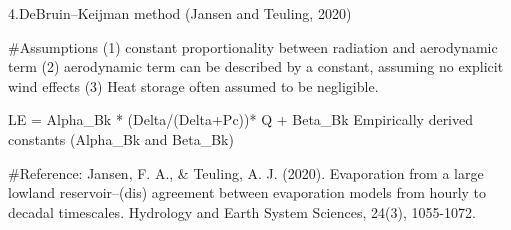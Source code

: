 \documentclass[
]{article}
\newenvironment{Shaded}{\begin{snugshade}}{\end{snugshade}}
\newcommand{\CommentTok}[1]{\textcolor[rgb]{0.56,0.35,0.01}{\textit{#1}}}
\newcommand{\FloatTok}[1]{\textcolor[rgb]{0.00,0.00,0.81}{#1}}
\newcommand{\NormalTok}[1]{#1}
\newcommand{\OtherTok}[1]{\textcolor[rgb]{0.56,0.35,0.01}{#1}}
\newcommand{\SpecialCharTok}[1]{\textcolor[rgb]{0.00,0.00,0.00}{#1}}
\begin{document}
\begin{Shaded}
\end{Shaded}

4.DeBruin--Keijman method (Jansen and Teuling, 2020)

\#Assumptions (1) constant proportionality between radiation and
aerodynamic term (2) aerodynamic term can be described by a constant,
assuming no explicit wind effects (3) Heat storage often assumed to be
negligible.

LE = Alpha\_Bk * (Delta/(Delta+Pc))* Q + Beta\_Bk Empirically derived
constants (Alpha\_Bk and Beta\_Bk)

\#Reference: Jansen, F. A., \& Teuling, A. J. (2020). Evaporation from a
large lowland reservoir--(dis) agreement between evaporation models from
hourly to decadal timescales. Hydrology and Earth System Sciences,
24(3), 1055-1072.
\end{document}
